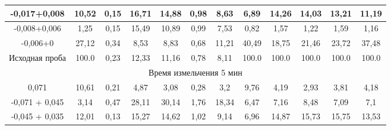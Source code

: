 {\begin{longtable}[c]{|p{}ccccccccccc|}
\multicolumn{1}{|c|}{-0,017+0,008} & \multicolumn{1}{c|}{10,52} & \multicolumn{1}{c|}{0,15} & \multicolumn{1}{c|}{16,71} & \multicolumn{1}{c|}{14,88} & \multicolumn{1}{c|}{0,98} & \multicolumn{1}{c|}{8,63} & \multicolumn{1}{c|}{6,89} & \multicolumn{1}{c|}{14,26} & \multicolumn{1}{c|}{14,03} & \multicolumn{1}{c|}{13,21} & 11,19 \\ \hline
\multicolumn{1}{|c|}{-0,008+0,006} & \multicolumn{1}{c|}{1,25} & \multicolumn{1}{c|}{0,15} & \multicolumn{1}{c|}{15,49} & \multicolumn{1}{c|}{10,89} & \multicolumn{1}{c|}{0,99} & \multicolumn{1}{c|}{7,53} & \multicolumn{1}{c|}{0,82} & \multicolumn{1}{c|}{1,57} & \multicolumn{1}{c|}{1,22} & \multicolumn{1}{c|}{1,59} & 1,16 \\ \hline
\multicolumn{1}{|c|}{-0,006+0} & \multicolumn{1}{c|}{27,12} & \multicolumn{1}{c|}{0,34} & \multicolumn{1}{c|}{8,53} & \multicolumn{1}{c|}{8,83} & \multicolumn{1}{c|}{0,68} & \multicolumn{1}{c|}{11,21} & \multicolumn{1}{c|}{40,49} & \multicolumn{1}{c|}{18,75} & \multicolumn{1}{c|}{21,46} & \multicolumn{1}{c|}{23,72} & 37,48 \\ \hline
\multicolumn{1}{|c|}{Исходная проба} & \multicolumn{1}{c|}{100.0} & \multicolumn{1}{c|}{0,23} & \multicolumn{1}{c|}{12,33} & \multicolumn{1}{c|}{11,16} & \multicolumn{1}{c|}{0,78} & \multicolumn{1}{c|}{8,11} & \multicolumn{1}{c|}{100.0} & \multicolumn{1}{c|}{100.0} & \multicolumn{1}{c|}{100.0} & \multicolumn{1}{c|}{100.0} & 100.0\\ \hline
\multicolumn{12}{|c|}{Время измельчения 5 мин} \\ \hline
\multicolumn{1}{|c|}{0,071} & \multicolumn{1}{c|}{10,61} & \multicolumn{1}{c|}{0,21} & \multicolumn{1}{c|}{4,87} & \multicolumn{1}{c|}{3,08} & \multicolumn{1}{c|}{0,28} & \multicolumn{1}{c|}{3,2} & \multicolumn{1}{c|}{9,76} & \multicolumn{1}{c|}{4,19} & \multicolumn{1}{c|}{2,93} & \multicolumn{1}{c|}{3,81} & 4,18 \\ \hline
\multicolumn{1}{|c|}{-0,071 + 0,045} & \multicolumn{1}{c|}{3,14} & \multicolumn{1}{c|}{0,47} & \multicolumn{1}{c|}{28,11} & \multicolumn{1}{c|}{30,14} & \multicolumn{1}{c|}{1,76} & \multicolumn{1}{c|}{18,34} & \multicolumn{1}{c|}{6,47} & \multicolumn{1}{c|}{7,16} & \multicolumn{1}{c|}{8,48} & \multicolumn{1}{c|}{7,09} & 7,1 \\ \hline
\multicolumn{1}{|c|}{-0,045 + 0,035} & \multicolumn{1}{c|}{12,01} & \multicolumn{1}{c|}{0,13} & \multicolumn{1}{c|}{15,27} & \multicolumn{1}{c|}{14,62} & \multicolumn{1}{c|}{1,02} & \multicolumn{1}{c|}{9,14} & \multicolumn{1}{c|}{6,96} & \multicolumn{1}{c|}{14,87} & \multicolumn{1}{c|}{15,73} & \multicolumn{1}{c|}{15,75} & 13,53 \\ \hline

\end{longtable}}
